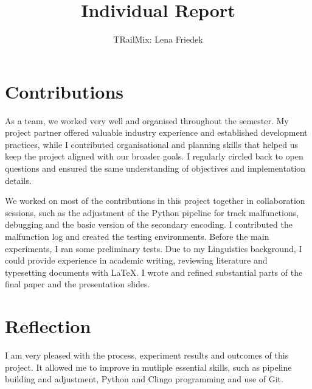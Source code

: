 \documentclass[runningheads]{llncs}
\begin{document}
%
\title{Individual Report}
%
%
\author{TRailMix: Lena Friedek}
%
%
%
\maketitle              %
%
%
%
%
%

\section{Contributions}
As a team, we worked very well and organised throughout the semester. My project partner offered valuable industry experience and established development practices, while I contributed organisational and planning skills that helped us keep the project aligned with our broader goals. I regularly circled back to open questions and ensured the same understanding of objectives and implementation details.  

We worked on most of the contributions in this project together in collaboration sessions, such as the adjustment of the Python pipeline for track malfunctions, debugging and the basic version of the secondary encoding. I contributed the malfunction log and created the testing environments. Before the main experiments, I ran some preliminary tests. 
Due to my Linguistics background, I could provide experience in academic writing, reviewing literature and typesetting documents with \LaTeX. I wrote and refined substantial parts of the final paper and the presentation slides.


\section{Reflection}
I am very pleased with the process, experiment results and outcomes of this project. It allowed me to improve in mutliple essential skills, such as pipeline building and adjustment, Python and Clingo programming and use of Git.
\end{document}
